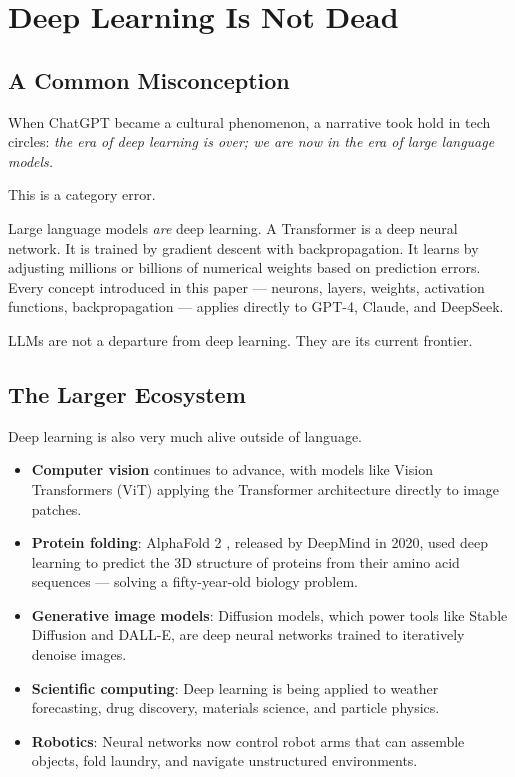 \section{Deep Learning Is Not Dead}

\subsection{A Common Misconception}

When ChatGPT became a cultural phenomenon, a narrative took hold in tech circles: \emph{the era of deep learning is over; we are now in the era of large language models.}

This is a category error.

Large language models \emph{are} deep learning.
A Transformer is a deep neural network.
It is trained by gradient descent with backpropagation.
It learns by adjusting millions or billions of numerical weights based on prediction errors.
Every concept introduced in this paper --- neurons, layers, weights, activation functions, backpropagation --- applies directly to GPT-4, Claude, and DeepSeek.

LLMs are not a departure from deep learning.
They are its current frontier.

\subsection{The Larger Ecosystem}

Deep learning is also very much alive outside of language.

\begin{itemize}
    \item \textbf{Computer vision} continues to advance, with models like Vision Transformers (ViT) \cite{dosovitskiy2020image} applying the Transformer architecture directly to image patches.
    \item \textbf{Protein folding}: AlphaFold 2 \cite{jumper2021highly}, released by DeepMind in 2020, used deep learning to predict the 3D structure of proteins from their amino acid sequences --- solving a fifty-year-old biology problem.
    \item \textbf{Generative image models}: Diffusion models, which power tools like Stable Diffusion and DALL-E, are deep neural networks trained to iteratively denoise images.
    \item \textbf{Scientific computing}: Deep learning is being applied to weather forecasting, drug discovery, materials science, and particle physics.
    \item \textbf{Robotics}: Neural networks now control robot arms that can assemble objects, fold laundry, and navigate unstructured environments.
\end{itemize}

